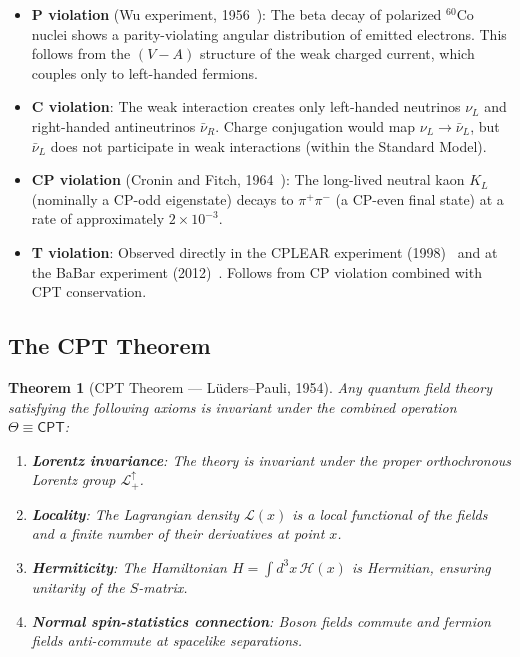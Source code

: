 \documentclass[12pt]{article}
\newtheorem{theorem}{Theorem}[section]
\theoremstyle{definition}
\theoremstyle{remark}
\newcommand{\Lagr}{\mathcal{L}}
\newcommand{\CPT}{\mathsf{CPT}}
\begin{document}
\begin{itemize}
    \item \textbf{P violation} (Wu experiment, 1956~\cite{Wu1957}): The beta decay
    of polarized ${}^{60}\text{Co}$ nuclei shows a parity-violating angular
    distribution of emitted electrons. This follows from the $(V-A)$ structure
    of the weak charged current, which couples only to left-handed fermions.

    \item \textbf{C violation}: The weak interaction creates only left-handed
    neutrinos $\nu_L$ and right-handed antineutrinos $\bar{\nu}_R$. Charge conjugation
    would map $\nu_L \to \bar{\nu}_L$, but $\bar{\nu}_L$ does not participate in
    weak interactions (within the Standard Model).

    \item \textbf{CP violation} (Cronin and Fitch, 1964~\cite{CroninFitch1964}):
    The long-lived neutral kaon $K_L$ (nominally a CP-odd eigenstate) decays to
    $\pi^+\pi^-$ (a CP-even final state) at a rate of approximately $2 \times 10^{-3}$.

    \item \textbf{T violation}: Observed directly in the CPLEAR experiment (1998)~\cite{CPLEAR1998}
    and at the BaBar experiment (2012)~\cite{BaBar2012}. Follows from CP violation
    combined with CPT conservation.
\end{itemize}

\subsection{The CPT Theorem}

\begin{theorem}[CPT Theorem --- L\"uders--Pauli, 1954]
\label{thm:cpt}
Any quantum field theory satisfying the following axioms is invariant under the
combined operation $\Theta \equiv \CPT$:
\begin{enumerate}
    \item[(A1)] \textbf{Lorentz invariance}: The theory is invariant under the proper
    orthochronous Lorentz group $\mathcal{L}^\uparrow_+$.
    \item[(A2)] \textbf{Locality}: The Lagrangian density $\Lagr(x)$ is a local
    functional of the fields and a finite number of their derivatives at point $x$.
    \item[(A3)] \textbf{Hermiticity}: The Hamiltonian $H = \int d^3x\, \mathcal{H}(x)$
    is Hermitian, ensuring unitarity of the $S$-matrix.
    \item[(A4)] \textbf{Normal spin-statistics connection}: Boson fields commute and
    fermion fields anti-commute at spacelike separations.
\end{enumerate}
\end{theorem}
\end{document}
